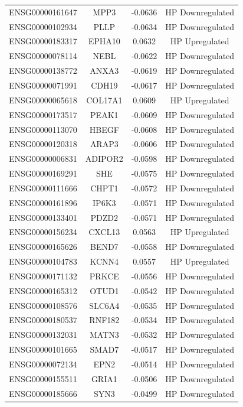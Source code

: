 \documentclass[
]{article}
\begin{document}
\begin{singlespace}
\begin{longtable}[t]{lccc}
ENSG00000161647 & MPP3 & -0.0636 & HP Downregulated\\
ENSG00000102934 & PLLP & -0.0634 & HP Downregulated\\
ENSG00000183317 & EPHA10 & 0.0632 & HP Upregulated\\
ENSG00000078114 & NEBL & -0.0622 & HP Downregulated\\
\addlinespace
ENSG00000138772 & ANXA3 & -0.0619 & HP Downregulated\\
ENSG00000071991 & CDH19 & -0.0617 & HP Downregulated\\
ENSG00000065618 & COL17A1 & 0.0609 & HP Upregulated\\
ENSG00000173517 & PEAK1 & -0.0609 & HP Downregulated\\
ENSG00000113070 & HBEGF & -0.0608 & HP Downregulated\\
\addlinespace
ENSG00000120318 & ARAP3 & -0.0606 & HP Downregulated\\
ENSG00000006831 & ADIPOR2 & -0.0598 & HP Downregulated\\
ENSG00000169291 & SHE & -0.0575 & HP Downregulated\\
ENSG00000111666 & CHPT1 & -0.0572 & HP Downregulated\\
ENSG00000161896 & IP6K3 & -0.0571 & HP Downregulated\\
\addlinespace
ENSG00000133401 & PDZD2 & -0.0571 & HP Downregulated\\
ENSG00000156234 & CXCL13 & 0.0563 & HP Upregulated\\
ENSG00000165626 & BEND7 & -0.0558 & HP Downregulated\\
ENSG00000104783 & KCNN4 & 0.0557 & HP Upregulated\\
ENSG00000171132 & PRKCE & -0.0556 & HP Downregulated\\
\addlinespace
ENSG00000165312 & OTUD1 & -0.0542 & HP Downregulated\\
ENSG00000108576 & SLC6A4 & -0.0535 & HP Downregulated\\
ENSG00000180537 & RNF182 & -0.0534 & HP Downregulated\\
ENSG00000132031 & MATN3 & -0.0532 & HP Downregulated\\
ENSG00000101665 & SMAD7 & -0.0517 & HP Downregulated\\
\addlinespace
ENSG00000072134 & EPN2 & -0.0514 & HP Downregulated\\
ENSG00000155511 & GRIA1 & -0.0506 & HP Downregulated\\
ENSG00000185666 & SYN3 & -0.0499 & HP Downregulated\\

\end{longtable}
\end{singlespace}
\end{document}
